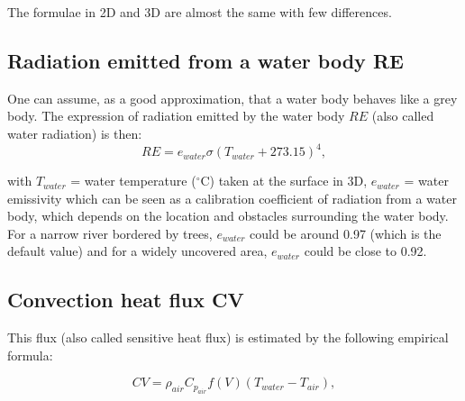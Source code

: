 The formulae in 2D and 3D are almost the same with few differences.


\subsection{Radiation emitted from a water body RE}

One can assume, as a good approximation, that a water body behaves like a grey body.
The expression of radiation emitted by the water body $RE$
(also called water radiation) is then:\\

\begin{equation}
  RE = e_{water} \sigma (T_{water} + 273.15)^4,
\end{equation}

with $T_{water}$ = water temperature ($^{\circ}$C)
taken at the surface in 3D,
$e_{water}$ = water emissivity which can be seen as a
calibration coefficient of radiation from a water body,
which depends on the location and obstacles surrounding the water body.
For a narrow river bordered by trees, $e_{water}$ could be around 0.97
(which is the default value)
and for a widely uncovered area, $e_{water}$ could be close to 0.92.

\subsection{Convection heat flux CV}

This flux (also called sensitive heat flux)
is estimated by the following empirical formula:

\begin{equation}
  CV = \rho_{air} C_{p_{air}} f(V) (T_{water} - T_{air}),
\end{equation}


